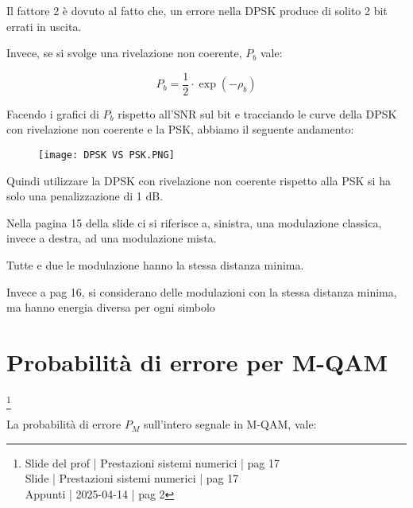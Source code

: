 Il fattore 2 è dovuto al fatto che, 
un errore nella DPSK produce di solito 2 bit errati in uscita. \newline 

Invece, se si svolge una rivelazione non coerente, $P_b$ vale: 

{
    \Large 
    \begin{equation}
        P_b = \frac{1}{2} \cdot \exp(- \rho_b)
    \end{equation}
}

Facendo i grafici di $P_b$ rispetto all'SNR sul bit e tracciando le curve della DPSK con rivelazione non coerente 
e la PSK, abbiamo il seguente andamento: 

\begin{figure}[h]
    \centering
    \texttt{[image: DPSK VS PSK.PNG]}
\end{figure}

\newpage 

Quindi utilizzare la DPSK con rivelazione non coerente rispetto alla PSK si ha solo una penalizzazione di 1 dB. \newline 

\begin{tcolorbox}

Nella pagina 15 della slide ci si riferisce a, sinistra, 
una modulazione classica, invece a destra, ad una modulazione mista. \newline 

Tutte e due le modulazione hanno la stessa distanza minima. \newline 

Invece a pag 16, si considerano delle modulazioni con la stessa distanza minima, 
ma hanno energia diversa per ogni simbolo
\end{tcolorbox}

\newpage 

\section{Probabilità di errore per M-QAM}
\footnote{Slide del prof | Prestazioni sistemi numerici | pag 17 \\
Slide | Prestazioni sistemi numerici | pag 17 \\ 
Appunti | 2025-04-14 | pag 2
}

La probabilità di errore $P_M$ sull'intero segnale in M-QAM, vale: 

